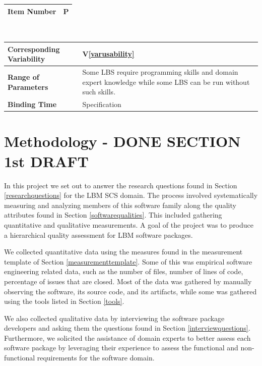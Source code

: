 \documentclass[12pt, notitlepage]{article}
\newcommand{\colEwidth}{0.33\textwidth}
\newcommand{\colFwidth}{0.67\textwidth}
\newcommand{\vref}[1]{V\ref{#1}}
\newcounter{parnum} %
\begin{document}
\begin{minipage}{\textwidth}
	\renewcommand*{\arraystretch}{1.5}
	\begin{tabular}{| p{\colEwidth} | p{\colFwidth}|}
		\hline
		\bf Item Number& P{parnum}\theparnum\label{parusability} \\
		\hline
	\end{tabular}\\
	
	\begin{tabular}{| p{\colEwidth} | p{\colFwidth}|}		
		\hline
		\bf Corresponding Variability & \vref{varusability}\\
		\hline
		\bf Range of Parameters & Some LBS require programming skills and domain expert knowledge while some LBS can be run without such skills.\\
		\hline
		\bf Binding Time & Specification\\
		\hline
	\end{tabular}
\end{minipage}

\newpage
\section{Methodology - DONE SECTION 1st DRAFT}

In this project we set out to answer the research questions found in Section \ref{researchquestions} for the LBM SCS domain. The process involved systematically measuring and analyzing members of this software family along the quality attributes found in Section \ref{softwarequalities}. This included gathering quantitative and qualitative measurements. A goal of the project was to produce a hierarchical quality assessment for LBM software packages.  

We collected quantitative data using the measures found in the measurement template of Section \ref{measurementtemplate}. Some of this was empirical software engineering related data, such as the number of files, number of lines of code, percentage of issues that are closed. Most of the data was gathered by manually observing the software, its source code, and its artifacts, while some was gathered using the tools listed in Section \ref{tools}.

We also collected qualitative data by interviewing the software package developers and asking them the questions found in Section \ref{interviewquestions}. Furthermore, we solicited the assistance of domain experts to better assess each software package by leveraging their experience to assess the functional and non-functional requirements for the software domain. 
\end{document}
